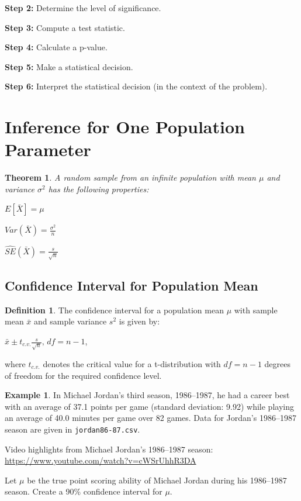 \documentclass[
  11pt,
]{book}
\newtheorem{theorem}{Theorem}[chapter]
\theoremstyle{definition}
\newtheorem{definition}{Definition}[chapter]
\theoremstyle{definition}
\newtheorem{example}{Example}[chapter]
\theoremstyle{definition}
\theoremstyle{definition}
\theoremstyle{remark}
\begin{document}
\textbf{Step 2:} Determine the level of significance.\\
\vfill

\textbf{Step 3:} Compute a test statistic.\\
\vfill 

\textbf{Step 4:} Calculate a p-value.\\
\vfill

\textbf{Step 5:} Make a statistical decision.\\
\vfill

\textbf{Step 6:} Interpret the statistical decision (in the context of the problem).\\
\vfill

\newpage

\hypertarget{inference-for-one-population-parameter}{%
\section{Inference for One Population Parameter}\label{inference-for-one-population-parameter}}

\begin{theorem}
A random sample from an infinite population with mean \(\mu\) and variance \(\sigma^2\) has the following properties:

\(E[\bar{X}] = \mu\)

\(Var(\bar{X}) = \frac{\sigma^2}{n}\)

\(\hat{SE}(\bar{X}) = \frac{s}{\sqrt{n}}\)
\end{theorem}

\hypertarget{confidence-interval-for-population-mean}{%
\subsection{Confidence Interval for Population Mean}\label{confidence-interval-for-population-mean}}

\begin{definition}
The confidence interval for a population mean \(\mu\) with sample mean \(\bar{x}\) and sample variance \(s^2\) is given by:

\(\bar{x} \pm t_{c.v.}\frac{s}{\sqrt{n}}, \, df=n-1\),

where \(t_{c.v.}\) denotes the critical value for a t-distribution with \(df=n-1\) degrees of freedom for the required confidence level.
\end{definition}

\begin{example}
In Michael Jordan's third season, 1986--1987, he had a career best with an average of 37.1 points per game (standard deviation: 9.92) while playing an average of 40.0 minutes per game over 82 games. Data for Jordan's 1986--1987 season are given in \texttt{jordan86-87.csv}.

Video highlights from Michael Jordan's 1986--1987 season:\\
\url{https://www.youtube.com/watch?v=cWSrUhhR3DA}

Let \(\mu\) be the true point scoring ability of Michael Jordan during his 1986--1987 season. Create a 90\% confidence interval for \(\mu\).
\end{example}
\end{document}
